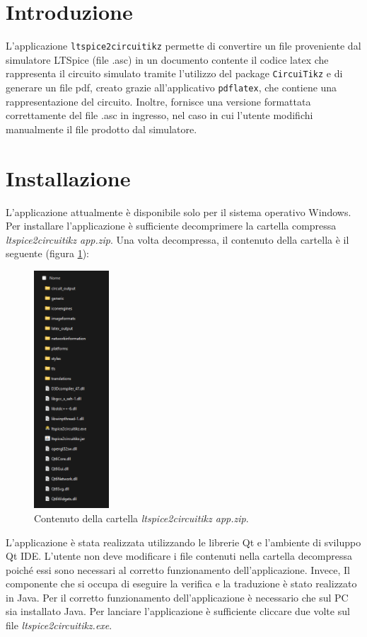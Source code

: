 \section{Introduzione}
L'applicazione \texttt{ltspice2circuitikz} permette di convertire un file proveniente dal simulatore LTSpice (file .asc) in un documento contente il codice latex che rappresenta il circuito simulato tramite l'utilizzo del package \texttt{CircuiTikz} e di generare un file pdf, creato grazie all'applicativo \texttt{pdflatex}, che contiene una rappresentazione del circuito. Inoltre, fornisce una versione formattata correttamente del file .asc in ingresso, nel caso in cui l'utente modifichi manualmente il file prodotto dal simulatore.
\section{Installazione}
L'applicazione attualmente è disponibile solo per il sistema operativo Windows. Per installare l'applicazione è sufficiente decomprimere la cartella compressa \textit{ltspice2circuitikz app.zip}. Una volta decompressa, il contenuto della cartella è il seguente (figura \ref{fig:contenuto}):
\begin{figure}[h!]
	\centering
	\includegraphics[width=0.25\textwidth]{./ImageFiles/contenuto.png}
	\caption{Contenuto della cartella \textit{ltspice2circuitikz app.zip}.}
	\label{fig:contenuto}
\end{figure}

\noindent
L'applicazione è stata realizzata utilizzando le librerie Qt e l'ambiente di sviluppo Qt IDE. L'utente non deve modificare i file contenuti nella cartella decompressa poiché essi sono necessari al corretto funzionamento dell'applicazione. Invece, Il componente che si occupa di eseguire la verifica e la traduzione è stato realizzato in Java. Per il corretto funzionamento dell'applicazione è necessario che sul PC sia installato Java. Per lanciare l'applicazione è sufficiente cliccare due volte sul file \textit{ltspice2circuitikz.exe}.
